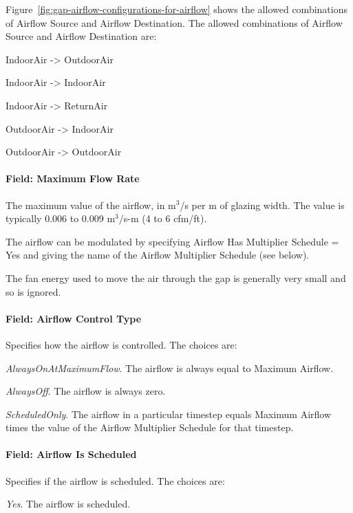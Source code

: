 Figure~\ref{fig:gap-airflow-configurations-for-airflow} shows the allowed combinations of Airflow Source and Airflow Destination. The allowed combinations of Airflow Source and Airflow Destination are:

IndoorAir -\textgreater{} OutdoorAir

IndoorAir -\textgreater{} IndoorAir

IndoorAir -\textgreater{} ReturnAir

OutdoorAir -\textgreater{} IndoorAir

OutdoorAir -\textgreater{} OutdoorAir

\paragraph{Field: Maximum Flow Rate}\label{field-maximum-flow-rate-003}

The maximum value of the airflow, in m\(^{3}\)/s per m of glazing width. The value is typically 0.006 to 0.009 m\(^{3}\)/s-m (4 to 6 cfm/ft).

The airflow can be modulated by specifying Airflow Has Multiplier Schedule = Yes and giving the name of the Airflow Multiplier Schedule (see below).

The fan energy used to move the air through the gap is generally very small and so is ignored.

\paragraph{Field: Airflow Control Type}\label{field-airflow-control-type}

Specifies how the airflow is controlled. The choices are:

\emph{AlwaysOnAtMaximumFlow}. The airflow is always equal to Maximum Airflow.

\emph{AlwaysOff}. The airflow is always zero.

\emph{ScheduledOnly}. The airflow in a particular timestep equals Maximum Airflow times the value of the Airflow Multiplier Schedule for that timestep.

\paragraph{Field: Airflow Is Scheduled}\label{field-airflow-is-scheduled}

Specifies if the airflow is scheduled. The choices are:

\emph{Yes}. The airflow is scheduled.

